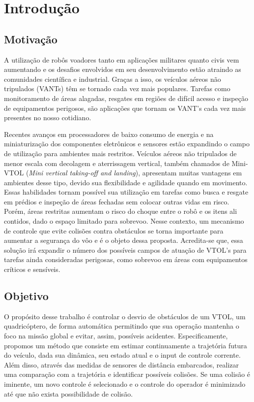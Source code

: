 \documentclass[a4paper, 12pt]{article}
\begin{document}
\newpage

\section{Introdução}

\subsection{Motivação}

A utilização de robôs voadores tanto em aplicações militares quanto civis vem aumentando e os desafios envolvidos em seu desenvolvimento estão atraindo as comunidades científica e industrial. Graças a isso, os veículos aéreos não tripulados (VANTs) têm se tornado cada vez mais populares. Tarefas como monitoramento de áreas alagadas, resgates em regiões de difícil acesso e inspeção de equipamentos perigosos, são aplicações que tornam os VANT's cada vez mais presentes no nosso cotidiano. 

Recentes avanços em processadores de baixo consumo de energia e na miniaturização dos componentes eletrônicos e sensores estão expandindo o campo de utilização para ambientes mais restritos. Veículos aéreos não tripulados de menor escala com decolagem e aterrissagem vertical, também chamados de Mini-VTOL (\textit{Mini vertical taking-off and landing}), apresentam muitas vantagens em ambientes desse tipo, devido sua flexibilidade e agilidade quando em movimento. Essas habilidades tornam possível sua utilização em tarefas como busca e resgate em prédios e inspeção de áreas fechadas sem colocar outras vidas em risco. Porém, áreas restritas aumentam o risco do choque entre o robô e os itens ali contidos, dado o espaço limitado para sobrevoo. Nesse contexto, um mecanismo de controle que evite colisões contra obstáculos se torna importante para aumentar a segurança do vôo e é o objeto dessa proposta. Acredita-se que, essa solução irá expandir o número dos possíveis campos de atuação de VTOL's para tarefas ainda consideradas perigosas, como sobrevoo em áreas com equipamentos críticos e sensíveis.



\subsection{Objetivo}

O propósito desse trabalho é controlar o desvio de obstáculos de um VTOL, um quadricóptero, de forma automática permitindo que sua operação mantenha o foco na missão global e evitar, assim, possíveis acidentes. Especificamente, propomos um método que consiste em estimar continuamente a trajetória futura do veículo, dada sua dinâmica, seu estado atual e o input de controle corrente. Além disso, através das medidas de sensores de distância embarcados, realizar uma comparação com a trajetória e identificar possíveis colisões. Se uma colisão é iminente, um novo controle é selecionado e o controle do operador é minimizado até que não exista possibilidade de colisão.
\end{document}
